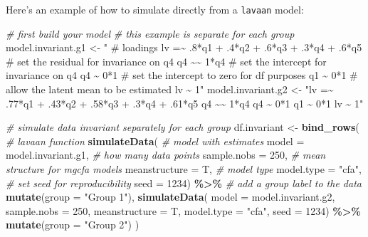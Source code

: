 \documentclass[
  man]{apa7}
\newenvironment{Shaded}{\begin{snugshade}}{\end{snugshade}}
\newcommand{\AttributeTok}[1]{\textcolor[rgb]{0.13,0.29,0.53}{#1}}
\newcommand{\CommentTok}[1]{\textcolor[rgb]{0.56,0.35,0.01}{\textit{#1}}}
\newcommand{\DecValTok}[1]{\textcolor[rgb]{0.00,0.00,0.81}{#1}}
\newcommand{\FunctionTok}[1]{\textcolor[rgb]{0.13,0.29,0.53}{\textbf{#1}}}
\newcommand{\NormalTok}[1]{#1}
\newcommand{\OtherTok}[1]{\textcolor[rgb]{0.56,0.35,0.01}{#1}}
\newcommand{\SpecialCharTok}[1]{\textcolor[rgb]{0.81,0.36,0.00}{\textbf{#1}}}
\newcommand{\StringTok}[1]{\textcolor[rgb]{0.31,0.60,0.02}{#1}}
\begin{document}
Here's an example of how to simulate directly from a \texttt{lavaan} model:

\small

\begin{Shaded}
\begin{Highlighting}[]
\CommentTok{\# first build your model}
\CommentTok{\# this example is separate for each group}
\NormalTok{model.invariant.g1 }\OtherTok{\textless{}{-}} \StringTok{"}
\StringTok{\# loadings}
\StringTok{lv =\textasciitilde{} .8*q1 + .4*q2 + .6*q3 + .3*q4 + .6*q5 }
\StringTok{\# set the residual for invariance on q4}
\StringTok{q4 \textasciitilde{}\textasciitilde{} 1*q4}
\StringTok{\# set the intercept for invariance on q4}
\StringTok{q4 \textasciitilde{} 0*1}
\StringTok{\# set the intercept to zero for df purposes}
\StringTok{q1 \textasciitilde{} 0*1}
\StringTok{\# allow the latent mean to be estimated }
\StringTok{lv \textasciitilde{} 1"}
\NormalTok{model.invariant.g2 }\OtherTok{\textless{}{-}} \StringTok{"lv =\textasciitilde{} .77*q1 + .43*q2 + .58*q3 + .3*q4 + .61*q5}
\StringTok{q4 \textasciitilde{}\textasciitilde{} 1*q4}
\StringTok{q4 \textasciitilde{} 0*1}
\StringTok{q1 \textasciitilde{} 0*1}
\StringTok{lv \textasciitilde{} 1"}

\CommentTok{\# simulate data invariant separately for each group}
\NormalTok{df.invariant }\OtherTok{\textless{}{-}} \FunctionTok{bind\_rows}\NormalTok{(}
  \CommentTok{\# lavaan function }
  \FunctionTok{simulateData}\NormalTok{(}
    \CommentTok{\# model with estimates }
    \AttributeTok{model =}\NormalTok{ model.invariant.g1, }
    \CommentTok{\# how many data points}
    \AttributeTok{sample.nobs =} \DecValTok{250}\NormalTok{, }
    \CommentTok{\# mean structure for mgcfa models }
    \AttributeTok{meanstructure =}\NormalTok{ T, }
    \CommentTok{\# model type}
    \AttributeTok{model.type =} \StringTok{"cfa"}\NormalTok{,}
    \CommentTok{\# set seed for reproducibility }
    \AttributeTok{seed =} \DecValTok{1234}\NormalTok{) }\SpecialCharTok{\%\textgreater{}\%} 
    \CommentTok{\# add a group label to the data }
    \FunctionTok{mutate}\NormalTok{(}\AttributeTok{group =} \StringTok{"Group 1"}\NormalTok{), }
  \FunctionTok{simulateData}\NormalTok{(}
    \AttributeTok{model =}\NormalTok{ model.invariant.g2, }
    \AttributeTok{sample.nobs =} \DecValTok{250}\NormalTok{, }
    \AttributeTok{meanstructure =}\NormalTok{ T, }
    \AttributeTok{model.type =} \StringTok{"cfa"}\NormalTok{,}
    \AttributeTok{seed =} \DecValTok{1234}\NormalTok{) }\SpecialCharTok{\%\textgreater{}\%} 
    \FunctionTok{mutate}\NormalTok{(}\AttributeTok{group =} \StringTok{"Group 2"}\NormalTok{) }
\NormalTok{)}
\end{Highlighting}
\end{Shaded}
\end{document}
